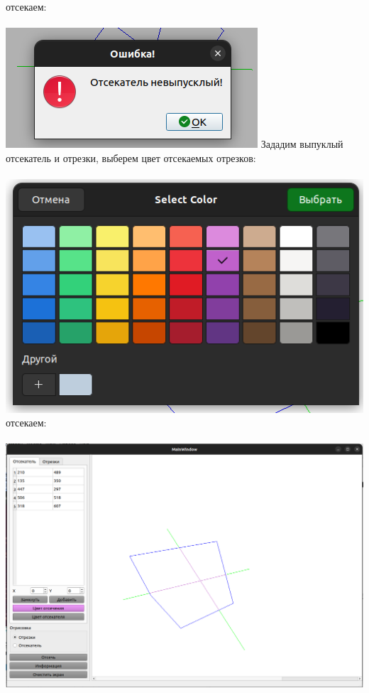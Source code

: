 \documentclass[a4paper,12pt]{article}
\begin{document}
	отсекаем:\\\\
	\includegraphics[width=\linewidth]{error}
	\newpage
	Зададим выпуклый отсекатель и отрезки, выберем цвет отсекаемых отрезков:\\\\
	\includegraphics[width=\linewidth]{color}\\
	отсекаем:\\\\
	\includegraphics[width=\linewidth]{normal}
	
\end{document}
